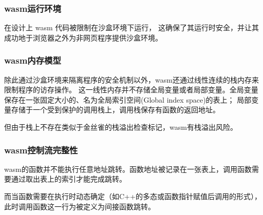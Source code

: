 \subsubsection{wasm运行环境}
在设计上 wasm 代码被限制在沙盒环境下运行\cite{johnsonWaVeVerifiablySecure2023,WasmbpfStreamliningEBPF2024}，\nolinebreak
这确保了其运行时安全，并让其成功地于浏览器之外为非网页程序提供沙盒环境\cite{narayanSwivelHardeningWebAssembly, WebAssemblySummaryOnSecurity, 9156135}。

\subsubsection{wasm内存模型}
除此通过沙盒环境来隔离程序的安全机制以外，wasm还通过线性连续的栈内存来限制程序的访存操作。\nolinebreak
这一线性内存并不存储全局变量或者局部变量。全局变量保存在一张固定大小的、名为全局索引空间(Global index space)的表上；\nolinebreak
局部变量存储于一个受到保护的调用栈上，调用栈保存有函数的返回地址。

但由于栈上不存在类似于金丝雀的栈溢出检查标记，wasm有栈溢出风险。

\subsubsection{wasm控制流完整性}
wasm的函数并不能执行任意地址跳转。函数地址被记录在一张表上，调用函数需要通过取出表上的索引才能完成跳转。

而当函数需要在执行时动态确定（如C++的多态或函数指针赋值后调用的形式），此时调用函数这一行为被定义为间接函数跳转\cite{Daniel2019DiscoveringVI}。